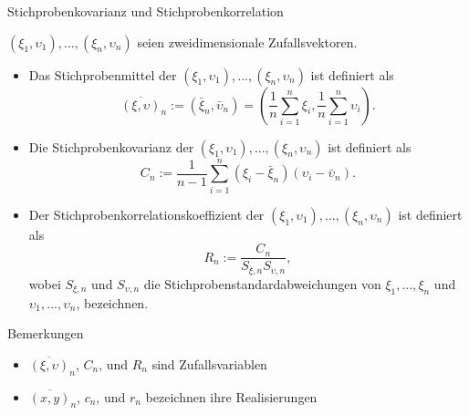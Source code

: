 \documentclass[
  8pt,
  ignorenonframetext,
]{beamer}
\providecommand{\tightlist}{%
  \setlength{\itemsep}{0pt}\setlength{\parskip}{0pt}}
\newcommand{\ups}{\upsilon}
\begin{document}
\begin{frame}{Stichprobenkovarianz und Stichprobenkorrelation}
\protect\hypertarget{stichprobenkovarianz-und-stichprobenkorrelation}{}
\footnotesize
{}
\begin{definition}
\justifying
$(\xi_1,\ups_1),...,(\xi_n,\ups_n)$ seien zweidimensionale Zufallsvektoren.
\begin{itemize}
\justifying
\item Das Stichprobenmittel der $(\xi_1,\ups_1),...,(\xi_n,\ups_n)$ ist definiert als
\begin{equation}
\overline{(\xi,\ups)}_n
:= (\bar{\xi}_n,\bar{\ups}_n)
= \left(\frac{1}{n}\sum_{i=1}^n \xi_i, \frac{1}{n} \sum_{i=1}^n \ups_i \right).
\end{equation}
\item Die Stichprobenkovarianz der $(\xi_1,\ups_1),...,(\xi_n,\ups_n)$ ist definiert als
\begin{equation}
C_n := \frac{1}{n-1}\sum_{i=1}^n (\xi_i - \bar{\xi}_n)(\ups_i - \bar{\ups}_n).
\end{equation}
\item Der Stichprobenkorrelationskoeffizient der $(\xi_1,\ups_1),...,(\xi_n,\ups_n)$ ist definiert als
\begin{equation}
R_n := \frac{C_n}{S_{\xi,n}S_{\ups,n}},
\end{equation}
wobei $S_{\xi,n}$ und $S_{\ups,n}$ die Stichprobenstandardabweichungen von $\xi_1,...,\xi_n$ und $\ups_1,..., \ups_n$, bezeichnen.
\end{itemize}
\end{definition}

Bemerkungen

\begin{itemize}
\tightlist
\item
  \(\overline{(\xi,\ups)}_n\), \(C_n\), und \(R_n\) sind
  Zufallsvariablen
\item
  \(\overline{(x,y)}_n\), \(c_n\), und \(r_n\) bezeichnen ihre
  Realisierungen
\end{itemize}
\end{frame}
\end{document}
